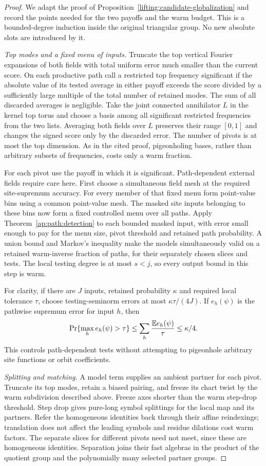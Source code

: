 \begin{proof}
We adapt the proof of Proposition~\ref{lifting:candidate-globalization}
and record the points needed for the two payoffs and the warm
budget.  This is a bounded-degree induction inside the original
triangular group.  No new absolute slots are introduced by it.

\emph{Top modes and a fixed menu of inputs.}
Truncate the top vertical Fourier expansions of both fields with
total uniform error much smaller than the current score.  On each
productive path call a restricted top frequency significant if
the absolute value of its tested average in either payoff exceeds
the score divided by a sufficiently large multiple of the total number of retained
modes.  The sum of all discarded averages is negligible.  Take
the joint connected annihilator $L$ in the kernel top torus and
choose a basis among all significant restricted frequencies from
the two lists.  Averaging both fields over $L$ preserves their
range $[0,1]$ and changes the signed score only by the discarded
error.  The number of pivots is at most the top dimension.  As in
the cited proof, pigeonholing bases, rather than arbitrary subsets
of frequencies, costs only a warm fraction.

For each pivot use the payoff in which it is significant.
Path-dependent external fields require care here.  First choose
a simultaneous field mesh at the required site-supremum accuracy.
For every member of that fixed menu form point-value bins using a
common point-value mesh.  The masked site inputs belonging to
these bins now form a fixed controlled menu over all paths.
Apply Theorem~\ref{ap:path:detection} to each bounded masked input,
with error small enough to pay for the menu size, pivot threshold
and retained path probability.  A union bound and Markov's
inequality make the models simultaneously valid on a retained
warm-inverse fraction of paths, for their separately chosen slices
and tests.  The local testing degree is at most $s<j$, so every
output bound in this step is warm.

For clarity, if there are $J$ inputs, retained probability $\kappa$
and required local tolerance $\tau$, choose testing-seminorm errors
at most $\kappa\tau/(4J)$.  If $e_h(\psi)$ is the pathwise supremum
error for input $h$, then
\[
 \Pr\{\max_h e_h(\psi)>\tau\}
 \leq\sum_h\frac{\mathbb E e_h(\psi)}{\tau}\leq\kappa/4.
\]
This controls path-dependent tests without attempting to pigeonhole
arbitrary site functions or orbit coefficients.

\emph{Splitting and matching.}
A model term supplies an ambient partner for each pivot.  Truncate
its top modes, retain a biased pairing, and freeze its chart twist
by the warm subdivision described above.  Freeze axes shorter
than the warm step-drop threshold.  Step drop gives pure-long
symbol splittings for the local map and its partners.  Refer the
homogeneous identities back through their affine reindexings;
translation does not affect the leading symbols and residue
dilations cost warm factors.  The separate slices for different
pivots need not meet, since these are homogeneous identities.
Separation joins their fast algebras in the product of the quotient
group and the polynomially many selected partner groups.


\end{proof}
